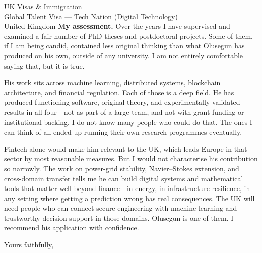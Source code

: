 \documentclass[12pt,a4paper]{letter}
\begin{document}
\begin{letter}{UK Visas \& Immigration\\
Global Talent Visa --- Tech Nation (Digital Technology)\\
United Kingdom}
\textbf{My assessment.} Over the years I have supervised and examined a fair number of PhD theses and postdoctoral projects. Some of them, if I am being candid, contained less original thinking than what Olusegun has produced on his own, outside of any university. I am not entirely comfortable saying that, but it is true.

His work sits across machine learning, distributed systems, blockchain architecture, and financial regulation. Each of those is a deep field. He has produced functioning software, original theory, and experimentally validated results in all four---not as part of a large team, and not with grant funding or institutional backing. I do not know many people who could do that. The ones I can think of all ended up running their own research programmes eventually.

Fintech alone would make him relevant to the UK, which leads Europe in that sector by most reasonable measures. But I would not characterise his contribution so narrowly. The work on power-grid stability, Navier--Stokes extension, and cross-domain transfer tells me he can build digital systems and mathematical tools that matter well beyond finance---in energy, in infrastructure resilience, in any setting where getting a prediction wrong has real consequences. The UK will need people who can connect secure engineering with machine learning and trustworthy decision-support in those domains. Olusegun is one of them. I recommend his application with confidence.

\vspace{1.5\baselineskip}

\closing{Yours faithfully,}

\end{letter}
\end{document}
